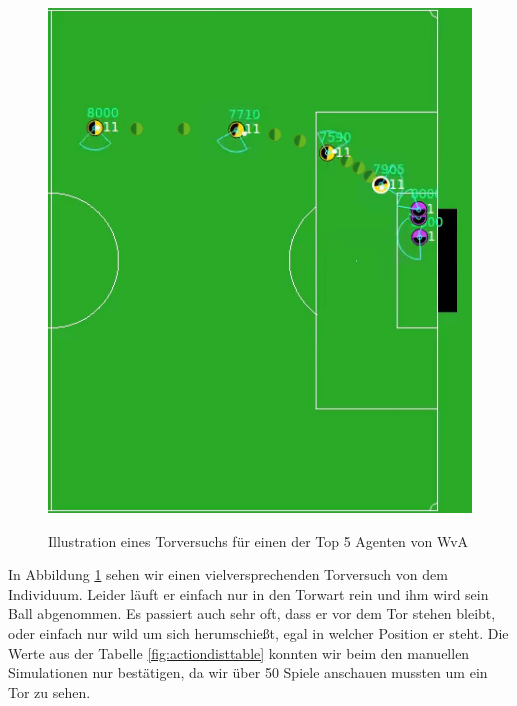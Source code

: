 \newpage
        \subsubsection*{}
        \begin{figure}[H]
            \begin{center}
                \includegraphics[scale=0.83]{../pictures/games/actiondist-gameplay.png}\\
                \caption{ Illustration eines Torversuchs für einen der Top 5 Agenten von WvA \label{fig:actiondist-gameplay}}
            \end{center}
        \end{figure}

        In Abbildung \ref{fig:actiondist-gameplay} sehen wir einen vielversprechenden Torversuch von dem Individuum. Leider läuft er einfach nur in den Torwart rein und ihm wird sein Ball abgenommen. Es passiert auch sehr oft, dass er vor dem Tor stehen bleibt, oder einfach nur wild um sich herumschießt, egal in welcher Position er steht. Die Werte aus der Tabelle \ref{fig:actiondisttable} konnten wir beim den manuellen Simulationen nur bestätigen, da wir über 50 Spiele anschauen mussten um ein Tor zu sehen.

\newpage
